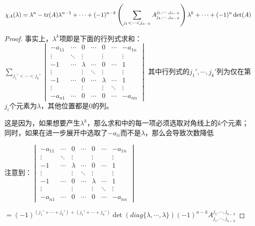 \documentclass[12pt, a4paper, oneside, UTF8]{ctexbook}
\begin{document}
\begin{para}{0}
\begin{proposition}
						\begin{equation}
							\chi_A(\lambda )=\lambda^n - \operatorname{tr}(A) \lambda^{n-1} + \cdots + (-1)^{n-k} \left(\sum\limits_{j_1 < \cdots < j_{n-k}} A_{j_1,\cdots,j_{n-k}}^{j_1,\cdots,j_{n-k}}\right) \lambda^k + \cdots + (-1)^n \det(A)
						\end{equation}
					\end{proposition}
					\begin{proof}
						事实上，$\lambda^k$项即是下面的行列式求和：
						$\sum\limits_{j_1' < \cdots < j_{k}'}\begin{vmatrix}
						-a_{11} & \cdots & 0 & \cdots & 0 & \cdots & -a_{1n} \\
						\vdots & \ddots & \vdots & & \vdots & & \vdots \\
						-1 & \cdots & \lambda & \cdots & 0 & \cdots & 1 \\
						\vdots & & \vdots & \ddots & \vdots &  & \vdots \\
						-1 & \cdots & 0 & \cdots & \lambda & \cdots & 1 \\
						\vdots & & \vdots &  & \vdots & \ddots & \vdots \\
						-a_{n1} & \cdots & 0 & \cdots & 0 & \cdots & -a_{nn}
						\end{vmatrix}$
						其中行列式的$j_1',\cdots,j_{k}'$列为仅在第$j_i$个元素为$\lambda $，其他位置都是$0$的列。

						这是因为，如果想要产生$\lambda^k$，那么求和中的每一项必须选取对角线上的$k$个元素；同时，如果在进一步展开中选取了$-a_{ii}$而不是$\lambda $，那么会导致次数降低

						注意到：$\begin{vmatrix}
						-a_{11} & \cdots & 0 & \cdots & 0 & \cdots & -a_{1n} \\
						\vdots & \ddots & \vdots & & \vdots & & \vdots \\
						-1 & \cdots & \lambda & \cdots & 0 & \cdots & 1 \\
						\vdots & & \vdots & \ddots & \vdots &  & \vdots \\
						-1 & \cdots & 0 & \cdots & \lambda & \cdots & 1 \\
						\vdots & & \vdots &  & \vdots & \ddots & \vdots \\
						-a_{n1} & \cdots & 0 & \cdots & 0 & \cdots & -a_{nn}
						\end{vmatrix}$

						$=(-1)^{(j_1'+\cdots+j_{k}')+(j_1'+\cdots+j_{k}')}\det(diag\{\lambda,\cdots,\lambda \})(-1)^{n-k}A_{j_1,\cdots,j_{n-k}}^{j_1,\cdots,j_{n-k}}$


\end{proof}
\end{para}
\end{document}
